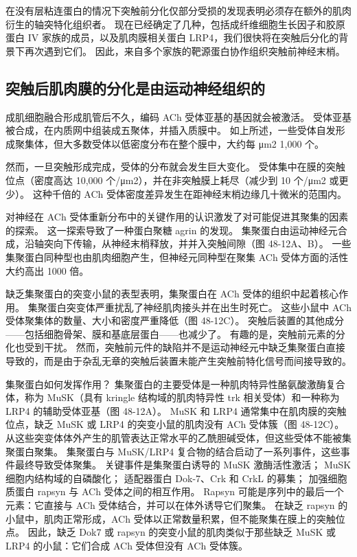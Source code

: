 在没有层粘连蛋白的情况下突触前分化仅部分受损的发现表明必须存在额外的肌肉衍生的轴突特化组织者。 现在已经确定了几种，包括成纤维细胞生长因子和胶原蛋白 IV 家族的成员，以及肌肉膜相关蛋白 LRP4，我们很快将在突触后分化的背景下再次遇到它们。 因此，来自多个家族的靶源蛋白协作组织突触前神经末梢。

\subsection{突触后肌肉膜的分化是由运动神经组织的}
成肌细胞融合形成肌管后不久，编码 ACh 受体亚基的基因就会被激活。 受体亚基被合成，在内质网中组装成五聚体，并插入质膜中。 如上所述，一些受体自发形成聚集体，但大多数受体以低密度分布在整个膜中，大约每 μm2 1,000 个。

然而，一旦突触形成完成，受体的分布就会发生巨大变化。 受体集中在膜的突触位点（密度高达 10,000 个/μm2），并在非突触膜上耗尽（减少到 10 个/μm2 或更少）。 这种千倍的 ACh 受体密度差异发生在距神经末梢边缘几十微米的范围内。

对神经在 ACh 受体重新分布中的关键作用的认识激发了对可能促进其聚集的因素的探索。 这一探索导致了一种蛋白聚糖 agrin 的发现。 集聚蛋白由运动神经元合成，沿轴突向下传输，从神经末梢释放，并并入突触间隙（图 48-12A、B）。 一些集聚蛋白同种型也由肌肉细胞产生，但神经元同种型在聚集 ACh 受体方面的活性大约高出 1000 倍。

缺乏集聚蛋白的突变小鼠的表型表明，集聚蛋白在 ACh 受体的组织中起着核心作用。 集聚蛋白突变体严重扰乱了神经肌肉接头并在出生时死亡。 这些小鼠中 ACh 受体聚集体的数量、大小和密度严重降低（图 48-12C）。 突触后装置的其他成分——包括细胞骨架、膜和基底层蛋白——也减少了。 有趣的是，突触前元素的分化也受到干扰。 然而，突触前元件的缺陷并不是运动神经元中缺乏集聚蛋白直接导致的，而是由于杂乱无章的突触后装置未能产生突触前特化信号而间接导致的。

集聚蛋白如何发挥作用？ 集聚蛋白的主要受体是一种肌肉特异性酪氨酸激酶复合体，称为 MuSK（具有 kringle 结构域的肌肉特异性 trk 相关受体）和一种称为 LRP4 的辅助受体亚基（图 48-12A）。 MuSK 和 LRP4 通常集中在肌肉膜的突触位点，缺乏 MuSK 或 LRP4 的突变小鼠的肌肉没有 ACh 受体簇（图 48-12C）。 从这些突变体体外产生的肌管表达正常水平的乙酰胆碱受体，但这些受体不能被集聚蛋白聚集。 集聚蛋白与 MuSK/LRP4 复合物的结合启动了一系列事件，这些事件最终导致受体聚集。 关键事件是集聚蛋白诱导的 MuSK 激酶活性激活； MuSK 细胞内结构域的自磷酸化； 适配器蛋白 Dok-7、Crk 和 CrkL 的募集； 加强细胞质蛋白 rapsyn 与 ACh 受体之间的相互作用。 Rapsyn 可能是序列中的最后一个元素：它直接与 ACh 受体结合，并可以在体外诱导它们聚集。 在缺乏 rapsyn 的小鼠中，肌肉正常形成，ACh 受体以正常数量积累，但不能聚集在膜上的突触位点。 因此，缺乏 Dok7 或 rapsyn 的突变小鼠的肌肉类似于那些缺乏 MuSK 或 LRP4 的小鼠：它们合成 ACh 受体但没有 ACh 受体簇。

